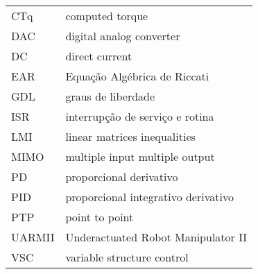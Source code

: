 \begin{xltabular}{\textwidth}{l X}
    CTq    & computed torque                     \\
    DAC    & digital analog converter            \\
    DC     & direct current                      \\
    EAR    & Equação Algébrica de Riccati        \\
    GDL    & graus de liberdade                  \\
    ISR    & interrupção de serviço e rotina     \\
    LMI    & linear matrices inequalities        \\
    MIMO   & multiple input multiple output      \\
    PD     & proporcional derivativo             \\
    PID    & proporcional integrativo derivativo \\
    PTP    & point to point                      \\
    UARMII & Underactuated Robot Manipulator II  \\
    VSC    & variable structure control          \\
\end{xltabular}
